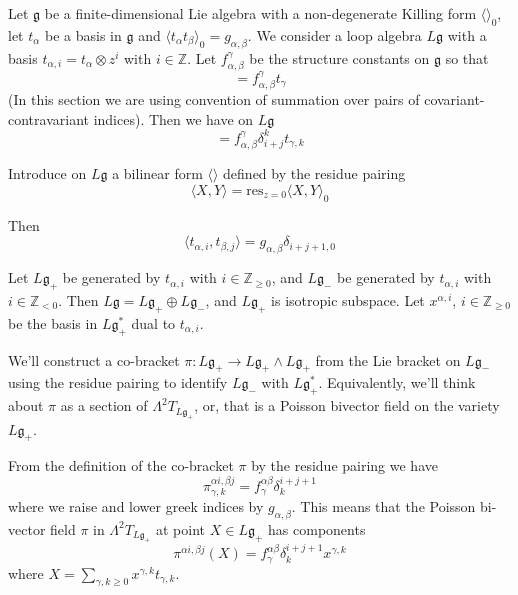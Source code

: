 \documentclass[11pt, oneside, reqno]{amsart}
\theoremstyle{definition} \newtheorem{definition}{Definition}[section]
\theoremstyle{definition} \newtheorem{remark}[definition]{Remark}
\theoremstyle{definition} \newtheorem{remarks}[definition]{Remarks}
\theoremstyle{definition} \newtheorem{question}[definition]{Question}
\theoremstyle{definition} \newtheorem*{note}{Note}
\theoremstyle{definition} \newtheorem{example}[definition]{Example}
\theoremstyle{definition} \newtheorem{examples}[definition]{Examples}
\renewcommand{\gg}{\mathfrak{g}}
\begin{document}
Let $\gg$ be a finite-dimensional Lie algebra with a non-degenerate
Killing form $\langle \rangle_0$, let $t_\alpha$ be a basis in $\gg$ and
$\langle t_\alpha t_\beta \rangle_0  = g_{\alpha, \beta}$. We consider a loop
algebra $L \gg$ with a basis
$t_{\alpha, i} = t_{\alpha} \otimes z^{i}$ with $i \in \mathbb{Z}$.
Let $f_{\alpha, \beta}^{\gamma}$ be the structure constants on $\gg$ so that
\begin{equation}
  [t_\alpha, t_\beta] = f^{\gamma}_{\alpha, \beta} t_{\gamma} 
\end{equation}
(In this section we are using convention of summation over pairs of covariant-contravariant indices).
Then we have on $L \gg$
\begin{equation}
  [t_{\alpha, i}, t_{\beta, j} ] = f^{\gamma}_{\alpha, \beta} \delta^{k}_{i+j} t_{\gamma, k} 
\end{equation}

Introduce on $L\gg$ a bilinear form
$\langle \rangle$ defined  by the residue pairing
\begin{equation}
  \langle X, Y \rangle = \mathrm{res}_{z=0} \langle X , Y \rangle_0 
\end{equation}

Then
\begin{equation}
  \langle t_{\alpha, i}, t_{\beta, j}  \rangle =  g_{\alpha, \beta}  \delta_{i+j+1,0}
\end{equation}


Let $L\gg_{+}$ be generated by $t_{\alpha, i}$ with $i \in \mathbb{Z}_{\geq 0}$,
and $L\gg_{-}$ be generated by $t_{\alpha, i}$ with $i \in \mathbb{Z}_{<0}$.
Then $L\gg = L\gg_{+} \oplus L\gg_{-}$, and $L\gg_{+}$ is isotropic subspace.
Let $x^{\alpha, i}$, $i \in \mathbb{Z}_{\geq 0}$  be the basis in
$ L \gg_{+}^{*}$ dual to $t_{\alpha, i}$.

We'll construct a co-bracket $\pi: L \gg_{+} \to L \gg_{+} \wedge L\gg_{+}$
from the Lie bracket on $L \gg_{-}$ using the residue pairing to identify
$L \gg_{-}$ with $L \gg_{+}^{*}$. Equivalently, we'll think about $\pi$ as a
section of $\Lambda^{2} T_{L \gg_{+}}$, or, that is a Poisson bivector field
on the variety $L\gg_{+}$.

From the definition of the co-bracket $\pi$ by the residue pairing we have
\begin{equation}
  \pi^{\alpha i, \beta j}_{\gamma, k}  = f^{\alpha \beta}_{\gamma} \delta ^{i + j +1}_{k} 
\end{equation}
where we raise and lower greek indices by $g_{\alpha, \beta}$. This means
that the Poisson bi-vector field $\pi$  in $\Lambda^{2} T_{L \gg_{+}}$ at point $X \in L\gg_{+}$ has components
\begin{equation}
  \pi^{\alpha i, \beta j} (X) = f^{\alpha \beta}_{\gamma} \delta ^{i + j +1}_{k} x^{\gamma, k} 
\end{equation}
where $X = \sum_{\gamma, k \geq 0} x^{\gamma, k}  t_{\gamma, k} $. 
\end{document}
